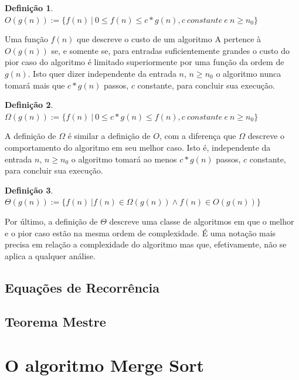 \documentclass[12pt]{article}
\theoremstyle{definition}
\newtheorem{definition}{Definição}[section]
\begin{document}
\theoremstyle{definition}
\begin{definition}
        $O(g(n)) := \{f(n)\ |\ 0 \leq f(n) \leq c * g(n), c\ constante\ e\ n \geq n_0\}$        
\end{definition}

Uma função $f(n)$ que descreve o custo de um algoritmo A pertence à $O(g(n))$ se, e somente se, para entradas 
suficientemente grandes o custo do pior caso do algoritmo é limitado superiormente por uma função da ordem de $g(n)$.
Isto quer dizer independente da entrada $n$, $n \geq n_0$  o algoritmo nunca tomará mais que $c * g(n)$ passos, $c$ constante, para concluir
sua execução.

\theoremstyle{definition}
\begin{definition}
        $\Omega(g(n)) := \{f(n)\ |\ 0 \leq c * g(n) \leq f(n), c\ constante\ e\ n \geq n_0\}$        
\end{definition}

A definição de $\Omega$ é similar a definição de $O$, com a diferença que $\Omega$ descreve o comportamento do algoritmo
em seu melhor caso. Isto é, independente da entrada $n$, $n \geq n_0$ o algoritmo tomará ao menos $c * g(n)$ passos, $c$ constante, para concluir
sua execução.

\theoremstyle{definition}
\begin{definition}
        $\Theta(g(n)) := \{f(n)\ | f(n) \in \Omega(g(n)) \wedge f(n) \in O(g(n))\}$        
\end{definition}

Por último, a definição de $\Theta$ descreve uma classe de algoritmos em que o melhor e o pior caso estão na mesma ordem
de complexidade. É uma notação mais precisa em relação a complexidade do algoritmo mas que, efetivamente, não se aplica
a qualquer análise.

\subsection{Equações de Recorrência}

\subsection{Teorema Mestre}

\section{O algoritmo Merge Sort}
\label{merge_sort}
\end{document}
